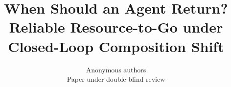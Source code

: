 \documentclass{article}
\title{When Should an Agent Return?\\Reliable Resource-to-Go under Closed-Loop Composition Shift}
\author{Anonymous authors\\Paper under double-blind review}
\begin{document}
\maketitle
\begin{abstract}

\end{abstract}















\clearpage
\appendix




\end{document}
